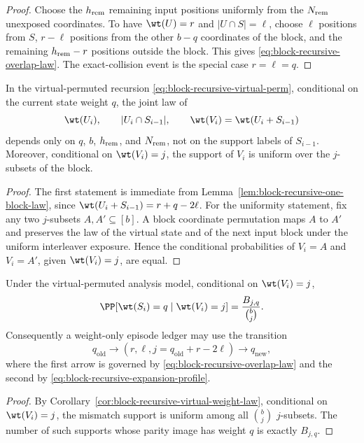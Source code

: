 \begin{proof}
Choose the \(h_{\rm rem}\) remaining input positions uniformly from the \(N_{\rm rem}\) unexposed coordinates.  To have
\(\wt(U)=r\) and \(|U\cap S|=\ell\), choose \(\ell\) positions from \(S\), \(r-\ell\) positions from the other
\(b-q\) coordinates of the block, and the remaining \(h_{\rm rem}-r\) positions outside the block.  This gives
\eqref{eq:block-recursive-overlap-law}.  The exact-collision event is the special case \(r=\ell=q\).
\end{proof}

\begin{corollary}
\label{cor:block-recursive-virtual-weight-law}
In the virtual-permuted recursion \eqref{eq:block-recursive-virtual-perm}, conditional on the current state weight
\(q\), the joint law of
\[
\wt(U_i),\qquad |U_i\cap S_{i-1}|,\qquad \wt(V_i)=\wt(U_i+S_{i-1})
\]
depends only on \(q\), \(b\), \(h_{\rm rem}\), and \(N_{\rm rem}\), not on the support labels of \(S_{i-1}\).  Moreover,
conditional on \(\wt(V_i)=j\), the support of \(V_i\) is uniform over the \(j\)-subsets of the block.
\end{corollary}

\begin{proof}
The first statement is immediate from Lemma~\ref{lem:block-recursive-one-block-law}, since
\(\wt(U_i+S_{i-1})=r+q-2\ell\).  For the uniformity statement, fix any two \(j\)-subsets \(A,A'\subseteq[b]\).  A block
coordinate permutation maps \(A\) to \(A'\) and preserves the law of the virtual state and of the next input block under
the uniform interleaver exposure.  Hence the conditional probabilities of \(V_i=A\) and \(V_i=A'\), given
\(\wt(V_i)=j\), are equal.
\end{proof}

\begin{corollary}
\label{cor:block-recursive-profile-transition}
Under the virtual-permuted analysis model, conditional on \(\wt(V_i)=j\),
\[
\PP[\wt(S_i)=q\mid \wt(V_i)=j]
=
\frac{B_{j,q}}{\binom{b}{j}}.
\]
Consequently a weight-only episode ledger may use the transition
\[
q_{\mathrm{old}}
\longrightarrow
(r,\ell,j=q_{\mathrm{old}}+r-2\ell)
\longrightarrow
q_{\mathrm{new}},
\]
where the first arrow is governed by \eqref{eq:block-recursive-overlap-law} and the second by
\eqref{eq:block-recursive-expansion-profile}.
\end{corollary}

\begin{proof}
By Corollary~\ref{cor:block-recursive-virtual-weight-law}, conditional on \(\wt(V_i)=j\), the mismatch support is
uniform among all \(\binom{b}{j}\) \(j\)-subsets.  The number of such supports whose parity image has weight \(q\) is
exactly \(B_{j,q}\).
\end{proof}

